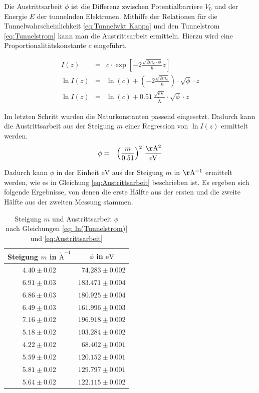 \documentclass[12pt,a4paper]{scrartcl}
\numberwithin{equation}{section} %
\begin{document}
Die Austrittsarbeit $\phi$ ist die Differenz zwischen Potentialbarriere $V_0$ und der Energie $E$ der tunnelnden Elektronen. Mithilfe der Relationen für die Tunnelwahrscheinlichkeit \eqref{eq:Tunnelwkt Kappa} und den Tunnelstrom \eqref{eq:Tunnelstrom} kann man die Austrittsarbeit ermitteln. Hierzu wird eine Proportionalitätskonstante $c$ eingeführt.

\begin{eqnarray}
    I(z) &=& c \cdot \exp\left[-2\frac{\sqrt{2m_e\cdot \phi}}{\hbar} z\right] \\
    \ln I(z)
        &=& \ln(c)
            + \left(-2\frac{\sqrt{2m_e}}{\hbar}\right)
            \cdot \sqrt{\phi} \cdot z \\
    \ln I(z) &=& \ln(c) + 0.51 \mathrm{\,\frac{\sqrt{eV}}{\mathrm{\mathring{A}}}}\cdot \sqrt{\phi} \cdot z \label{eq: ln(Tunnelstrom)}
\end{eqnarray}

\noindent
Im letzten Schritt wurden die Naturkonstanten passend eingesetzt.
\cite{Anleitung} Dadurch kann die Austrittsarbeit aus der Steigung $m$ einer
Regression von $\ln I(z)$ ermittelt werden.
\begin{eqnarray}
    \phi &=& \left(\frac{m}{0.51}\right)^2 \mathrm{\,\frac{\AA^2}{eV}} \label{eq:Austrittsarbeit}
\end{eqnarray}

\noindent
Dadurch kann $\phi$ in der Einheit $\mathrm{eV}$ aus der Steigung $m$ in $\mathrm{\AA^{-1}}$ ermittelt werden, wie es in Gleichung \eqref{eq:Austrittsarbeit} beschrieben ist. Es ergeben sich folgende Ergebnisse, von denen die erste Hälfte aus der ersten und die zweite Hälfte aus der zweiten Messung stammen.

\begin{table}[h!]
	\centering
	\begin{tabular}{cc}
		Steigung $m$ in $\mathrm{\mathring A}^{-1}$
			& $\phi$ in $\mathrm{eV}$ \\
		\hline
		$4.40 \pm 0.02$ & \ $74.283 \pm 0.002$ \\
		$6.91 \pm 0.03$ & $183.471 \pm 0.004$ \\
		$6.86 \pm 0.03$ & $180.925 \pm 0.004$ \\
		$6.49 \pm 0.03$ & $161.996 \pm 0.003$ \\
		$7.16 \pm 0.02$ & $196.918 \pm 0.002$ \\
		$5.18 \pm 0.02$ & $103.284 \pm 0.002$ \\
		$4.22 \pm 0.02$ & \ $68.402 \pm 0.001$ \\
		$5.59 \pm 0.02$ & $120.152 \pm 0.001$ \\
		$5.81 \pm 0.02$ & $129.797 \pm 0.001$ \\
		$5.64 \pm 0.02$ & $122.115 \pm 0.002$ \\
	\end{tabular}
	\caption{Steigung $m$ und Austrittsarbeit $\phi$\\
		nach Gleichungen \eqref{eq: ln(Tunnelstrom)} und \eqref{eq:Austrittsarbeit}}
	\label{table:Austrittsarbeit}
\end{table}
\end{document}
